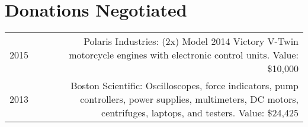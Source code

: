 \section*{Donations Negotiated}
\begin{tabular}{L!{\VRule}R}
2015&Polaris Industries: (2x) Model 2014 Victory V-Twin motorcycle engines with electronic control units. Value: \$10,000\\
2013&Boston Scientific: Oscilloscopes, force indicators, pump controllers, power supplies, multimeters, DC motors, centrifuges, laptops, and testers. Value: \$24,425\\
\end{tabular}